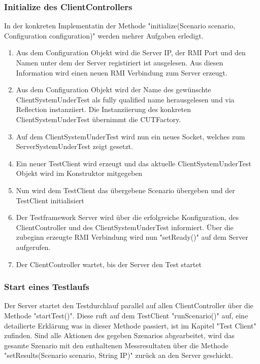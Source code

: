 \subsubsection{Initialize des ClientControllers}
In der konkreten Implementatin der Methode "initialize(Scenario scenario, Configuration configuration)" werden mehrer Aufgaben erledigt.
\begin{enumerate}
\item Aus dem Configuration Objekt wird die Server IP, der RMI Port und den Namen unter dem der Server registiriert ist ausgelesen. Aus diesen Information wird einen neuen RMI Verbindung zum Server erzeugt.
\item Aus dem Configuration Objekt wird der Name des gewünschte ClientSystemUnderTest als fully qualified name herausgelesen und via Reflection instanziiert. Die Instanziierung des konkreten ClientSystemUnderTest übernimmt die CUTFactory.
\item Auf dem ClientSystemUnderTest wird nun ein neues Socket, welches zum ServerSystemUnderTest zeigt gesetzt.
\item Ein neuer TestClient wird erzeugt und das aktuelle ClientSystemUnderTest Objekt wird im Konstruktor mitgegeben
\item Nun wird dem TestClient das übergebene Scenario übergeben und der TestClient initialisiert
\item Der Testframework Server wird über die erfolgreiche Konfiguration, des ClientController und des ClientSystemUnderTest informiert. Über die zubeginn erzeugte RMI Verbindung wird nun "setReady()" auf dem Server aufgerufen.
\item Der ClientController wartet, bis der Server den Test startet
\end{enumerate}

\subsubsection{Start eines Testlaufs}
Der Server startet den Testdurchlauf parallel auf allen ClientController über die Methode "startTest()". Diese ruft auf dem TestClient "runScenario()" auf, eine detailierte Erklärung was in dieser Methode passiert, ist im Kapitel "Test Client" zufinden. Sind alle Aktionen des gegeben Szenarios abgearbeitet, wird das gesamte Szenario mit den enthaltenen Messresultaten über die Methode "setResults(Scenario scenario, String IP)" zurück an den Server geschickt.

